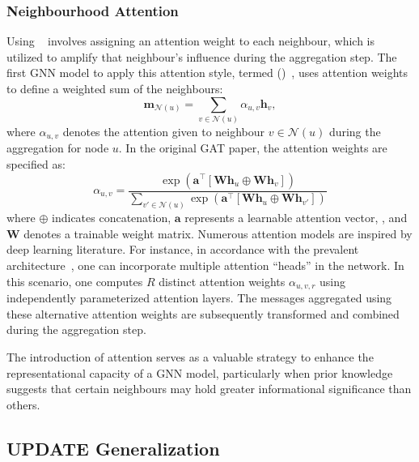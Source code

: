 \subsubsection{Neighbourhood Attention}\label{sec:neighbourhoodAttention}
Using ~\cite{Vaswani2017attentionIsAllYouNeed} involves assigning an attention weight to each neighbour, which is utilized to amplify that neighbour's influence during the aggregation step. The first GNN model to apply this attention style, termed  ()~\cite{Velivckovic2017graphAttentionNetworks}, uses attention weights to define a weighted sum of the neighbours:
\begin{equation*}
    \mathbf{m}_{\mathcal{N}(u)} = \sum_{v\in\mathcal{N}(u)} \alpha_{u,v}\mathbf{h}_v,
\end{equation*}
where $ \alpha_{u,v} $ denotes the attention given to neighbour $ v \in \mathcal{N}(u) $ during the aggregation for node $ u $. In the original GAT paper, the attention weights are specified as:
\begin{equation*}
    \alpha_{u,v} = \frac{\exp(\mathbf{a}^\top[\mathbf{W}\mathbf{h}_u \oplus \mathbf{W}\mathbf{h}_v])}{\sum_{v'\in\mathcal{N}(u)} \exp(\mathbf{a}^\top[\mathbf{W}\mathbf{h}_u \oplus \mathbf{W}\mathbf{h}_{v'}])}
\end{equation*}
where $ \oplus $ indicates concatenation, $ \mathbf{a} $ represents a learnable attention vector, , and $ \mathbf{W} $ denotes a trainable weight matrix.
Numerous attention models are inspired by deep learning literature. For instance, in accordance with the prevalent  architecture~\cite{Vaswani2017attentionIsAllYouNeed}, one can incorporate multiple attention ``heads'' in the network. In this scenario, one computes $ R $ distinct attention weights $ \alpha_{u,v,r} $ using independently parameterized attention layers. The messages aggregated using these alternative attention weights are subsequently transformed and combined during the aggregation step.

\medskip
The introduction of attention serves as a valuable strategy to enhance the representational capacity of a GNN model, particularly when prior knowledge suggests that certain neighbours may hold greater informational significance than others.

\subsection{UPDATE Generalization}

